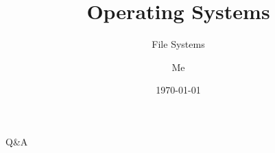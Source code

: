 \documentclass[12pt]{beamer}
\title{Operating Systems}
\subtitle{File Systems}
\author{Me}
\date{\today}
\begin{document}
  \begin{frame}
    \titlepage
  \end{frame}

  
  
  
  
  

  \begin{frame}
  \begin{center}
  \Huge Q\&A
  \end{center}
  \end{frame}
\end{document}

